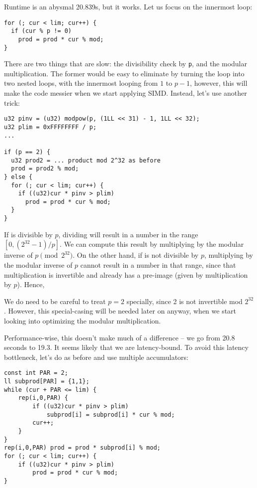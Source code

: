 \documentclass[openany]{book}
\begin{document}
Runtime is an abysmal 20.839s, but it works.
Let us focus on the innermost loop:
\begin{lstlisting}
for (; cur < lim; cur++) {
  if (cur % p != 0)
    prod = prod * cur % mod;
}
\end{lstlisting}

There are two things that are slow: the divisibility check by \texttt{p}, and the modular multiplication.
The former would be easy to eliminate by turning the loop into two nested loops, with the innermost looping from $1$ to $p-1$, however, this will make the code messier when we start applying SIMD.
Instead, let's use another trick:

\begin{lstlisting}
u32 pinv = (u32) modpow(p, (1LL << 31) - 1, 1LL << 32);
u32 plim = 0xFFFFFFFF / p;
...

if (p == 2) {
  u32 prod2 = ... product mod 2^32 as before
  prod = prod2 % mod;
} else {
  for (; cur < lim; cur++) {
    if ((u32)cur * pinv > plim)
      prod = prod * cur % mod;
  }
}
\end{lstlisting}

If \verb@cur@ is divisible by $p$, dividing will result in a number in the range $[0, (2^{32}-1) / p]$.
We can compute this result by multiplying by the modular inverse of $p \pmod{2^{32}}$.
On the other hand, if \verb@cur@ is not divisible by $p$, multiplying by the modular inverse of $p$ cannot result in a number in that range, since that multiplication is invertible and already has a pre-image (given by multiplication by $p$).
Hence, \verb@cur % p == 0@ can be replaced by \verb@(u32)cur * pinv <= plim@, multiplication being a much cheaper operation than modulo.

We do need to be careful to treat $p = 2$ specially, since 2 is not invertible mod $2^{32}$.
However, this special-casing will be needed later on anyway, when we start looking into optimizing the modular multiplication.

Performance-wise, this doesn't make much of a difference -- we go from 20.8 seconds to 19.3. It seems likely that we are latency-bound. To avoid this latency bottleneck, let's do as before and use multiple accumulators:

\begin{lstlisting}
const int PAR = 2;
ll subprod[PAR] = {1,1};
while (cur + PAR <= lim) {
	rep(i,0,PAR) {
		if ((u32)cur * pinv > plim)
			subprod[i] = subprod[i] * cur % mod;
		cur++;
	}
}
rep(i,0,PAR) prod = prod * subprod[i] % mod;
for (; cur < lim; cur++) {
	if ((u32)cur * pinv > plim)
		prod = prod * cur % mod;
}
\end{lstlisting}
\end{document}
